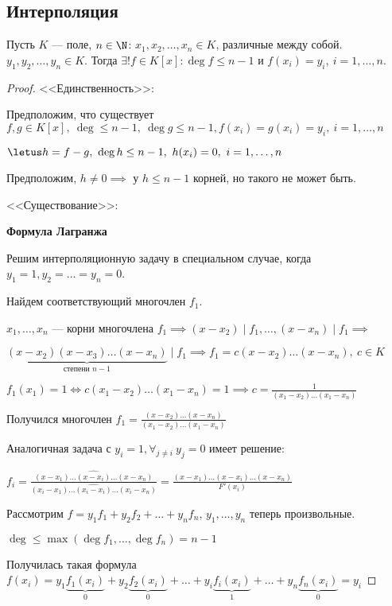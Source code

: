 \subsection{Интерполяция}

\begin{theorem}
    Пусть $K$ --- поле, $n \in \N$: $x_1, x_2, \ldots, x_n \in K$, различные между собой. $y_1, y_2, \ldots, y_n \in K$. Тогда $\exists! f \in K[x]: \deg f \leq n - 1$ и $f(x_i) = y_i,~i = 1, \ldots, n$.
\end{theorem}

\begin{proof}

    <<Единственность>>:

    Предположим, что существует $f, g \in K[x],~\deg \leq n - 1,~\deg g \leq n - 1, f(x_i) = g(x_i) = y_i,~i = 1, \ldots, n$

    $\letus h = f - g,~\deg h \leq n - 1,~h(x_i) = 0,~i = 1, \ldots, n$

    Предположим, $h \neq 0 \implies$ у $h \leq n - 1$ корней, но такого не может быть.

    <<Существование>>:

    \textbf{Формула Лагранжа}

    Решим интерполяционную задачу в специальном случае, когда $y_1 = 1, y_2 = \ldots = y_n = 0$.

    Найдем соответствующий многочлен $f_1$.

    $x_1, \ldots, x_n$ --- корни многочлена $f_1 \implies (x - x_2) \mid f_1, \ldots, (x - x_n) \mid f_1 \implies$ 

    $\underbrace{(x - x_2) (x - x_3) \ldots (x - x_n)}_{\text{степени } n - 1} \mid f_1 \implies f_1 = c(x - x_2) \ldots (x - x_n),~c \in K$

    $f_1 (x_1) = 1 \iff c (x_1 - x_2) \ldots (x_1 - x_n) = 1 \implies c = \frac{1}{(x_1 - x_2) \ldots (x_1 - x_n)}$

    Получился многочлен $f_1 = \frac{(x - x_2) \ldots (x - x_n)}{(x_1 - x_2) \ldots (x_1 - x_n)}$

    Аналогичная задача с $y_i = 1, \forall_{j \neq i}~y_j = 0$ имеет решение:

    $f_i = \frac{(x - x_1) \ldots \widehat{(x - x_i)} \ldots (x - x_n)}{(x_i - x_1) \ldots \widehat{(x_i - x_i)} \ldots (x_i - x_n)} = \frac{(x - x_1) \ldots \widehat{(x - x_i)} \ldots (x - x_n)}{F'(x_i)}$

    Рассмотрим $f = y_1 f_1 + y_2 f_2 + \ldots + y_n f_n$, $y_1, \ldots, y_n$ теперь произвольные.

    $\deg \leq \max(\deg f_1, \ldots, \deg f_n) = n - 1$

    Получилась такая формула $f(x_i) = y_1 \underbrace{f_1(x_i)}_0 + y_2 \underbrace{f_2(x_i)}_0 + \ldots + y_i \underbrace{f_i(x_i)}_1 + \ldots + y_n \underbrace{f_n(x_i)}_0 = y_i$

\end{proof}

